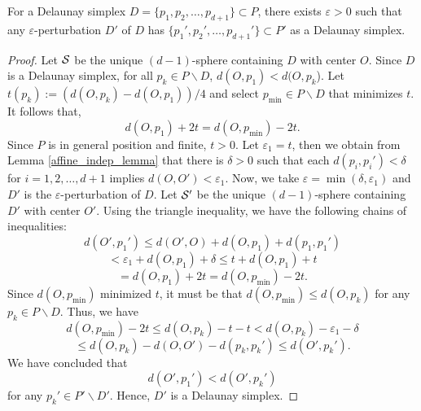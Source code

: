 \documentclass[letterpaper,titlepage]{article}
\begin{document}
\begin{lem}\label{stay-delaunay}
        For a Delaunay simplex $D= \{p_1,p_2,\dots,p_{d+1}\} \subset P$, there exists $\varepsilon>0$ such that any $\varepsilon$-perturbation $D'$ of $D$ has $\{p_1',p_2',\dots,p_{d+1}'\} \subset P'$ as a Delaunay simplex.
    \end{lem}
    \begin{proof}
        Let $\mathcal{S}$ be the unique $(d-1)$-sphere containing $D$ with center $O$. Since $D$ is a Delaunay simplex, for all $p_k \in P\backslash D$, $d(O,p_1) < d(O,p_k$). Let $t(p_k):=(d(O,p_k)-d(O,p_1))/4$ and select $p_{\min} \in P\backslash{D}$ that minimizes $t$. It follows that,
        $$d(O,p_1)+2t=d(O,p_{\min})-2t.$$
        Since $P$ is in general position and finite, $t>0$. Let $\varepsilon_1 = t$, then we obtain from Lemma \ref{affine_indep_lemma} that there is $\delta>0$ such that each $d(p_i,p_i')<\delta$ for $i=1,2,\dots,d+1$ implies $d(O,O')<\varepsilon_1$. Now, we take $\varepsilon = \min(\delta, \varepsilon_1)$ and $D'$ is the $\varepsilon$-perturbation of $D$. Let $\mathcal{S}'$ be the unique $(d-1)$-sphere containing $D'$ with center $O'$. Using the triangle inequality, we have the following chains of inequalities:
        $$d(O',p_1') \leq d(O',O)+d(O,p_1)+d(p_1,p_1')$$
        $$< \varepsilon_1 + d(O,p_1)+\delta \leq t+d(O,p_1)+t$$
        $$= d(O,p_1)+2t = d(O,p_{\min})-2t.$$
        Since $d(O,p_{\min})$ minimized $t$, it must be that $d(O,p_{\min}) \leq d(O,p_k)$ for any $p_k \in P\backslash D$. Thus, we have
        $$d(O,p_{\min})-2t \leq d(O,p_k)-t-t < d(O,p_{k})-\varepsilon_1-\delta$$
        $$\leq d(O,p_{k})-d(O,O')-d(p_{k},p_{k}') \leq d(O',p_{k}').$$
        We have concluded that
        $$d(O',p_1')<d(O',p_{k}')$$
        for any $p_k' \in P'\backslash D'$. Hence, $D'$ is a Delaunay simplex.
    \end{proof}
\end{document}
